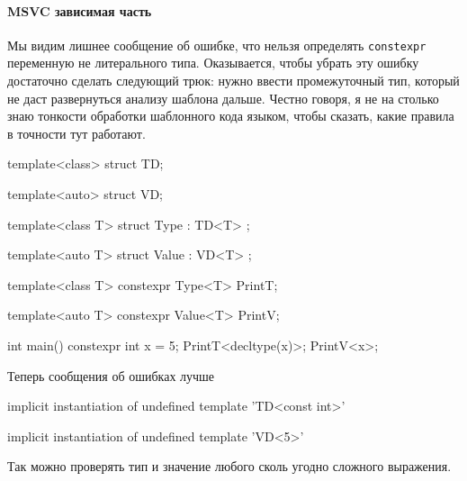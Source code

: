 \paragraph{MSVC зависимая часть}

Мы видим лишнее сообщение об ошибке, что нельзя определять \verb"constexpr" переменную не литерального типа.
Оказывается, чтобы убрать эту ошибку достаточно сделать следующий трюк: нужно ввести промежуточный тип, который не даст развернуться анализу шаблона дальше.
Честно говоря, я не на столько знаю тонкости обработки шаблонного кода языком, чтобы сказать, какие правила в точности тут работают.
\begin{cppcode}
template<class>
struct TD;

template<auto>
struct VD;

template<class T>
struct Type : TD<T> {};

template<auto T>
struct Value : VD<T> {};

template<class T>
constexpr Type<T> PrintT;

template<auto T>
constexpr Value<T> PrintV;

int main() {
  constexpr int x = 5;
  PrintT<decltype(x)>;
  PrintV<x>;
}
\end{cppcode}
Теперь сообщения об ошибках лучше
\begin{cppcode}
implicit instantiation of undefined template 'TD<const int>'

implicit instantiation of undefined template 'VD<5>'
\end{cppcode}
Так можно проверять тип и значение любого сколь угодно сложного выражения.
